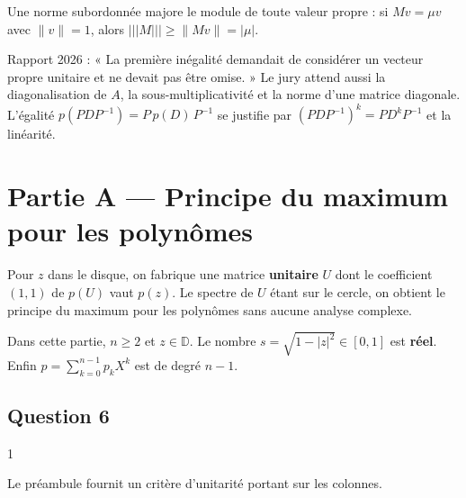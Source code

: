 \documentclass[11pt,a4paper]{article}
\newcommand{\equationajustee}[1]{%
  \sbox{\boiteequation}{$\displaystyle #1$}%
  \ifdim\wd\boiteequation>\linewidth
    \[\resizebox{\linewidth}{!}{\usebox{\boiteequation}}\]%
  \else
    \[#1\]%
  \fi}
\begin{document}
\equationajustee{\boxed{\|p\|_{\sigma(A)}\le\vert\!\vert\!\vert p(A)\vert\!\vert\!\vert \le\mathrm{cond}(P)\,\|p\|_{\sigma(A)}}}

\begin{methode}

Une norme subordonnée majore le module de toute valeur propre : si \(Mv=\mu v\) avec \(\|v\|=1\), alors \(\vert\!\vert\!\vert M\vert\!\vert\!\vert \ge\|Mv\|=|\mu|\).

\end{methode}

\begin{jury}

Rapport 2026 : « La première inégalité demandait de considérer un vecteur propre unitaire et ne devait pas être omise. » Le jury attend aussi la diagonalisation de \(A\), la sous-multiplicativité et la norme d'une matrice diagonale. L'égalité \(p(PDP^{-1})=P\,p(D)\,P^{-1}\) se justifie par \((PDP^{-1})^k=PD^kP^{-1}\) et la linéarité.

\end{jury}

\hypertarget{partie-a-principe-du-maximum-pour-les-polynuxf4mes}{%
\section{Partie A --- Principe du maximum pour les polynômes}\label{partie-a-principe-du-maximum-pour-les-polynuxf4mes}}

Pour \(z\) dans le disque, on fabrique une matrice \textbf{unitaire} \(U\) dont le coefficient \((1,1)\) de \(p(U)\) vaut \(p(z)\). Le spectre de \(U\) étant sur le cercle, on obtient le principe du maximum pour les polynômes sans aucune analyse complexe.

Dans cette partie, \(n\ge2\) et \(z\in\mathbb D\). Le nombre \(s=\sqrt{1-|z|^2}\in[0,1]\) est \textbf{réel}. Enfin \(p=\sum_{k=0}^{n-1}p_kX^k\) est de degré \(n-1\).

\hypertarget{question-6}{%
\subsection{Question 6}\label{question-6}}

\begin{indication}{1}

Le préambule fournit un critère d'unitarité portant sur les colonnes.

\end{indication}
\end{document}
